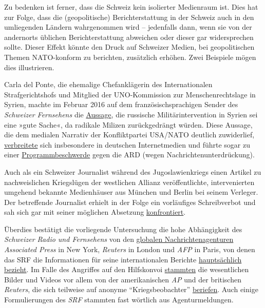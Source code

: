 Zu bedenken ist ferner, dass die Schweiz kein isolierter Medienraum ist.
Dies hat zur Folge, dass die (geopolitische) Berichterstattung in der
Schweiz auch in den umliegenden Ländern wahrgenommen wird -- jedenfalls
dann, wenn sie von der andernorts üblichen Berichterstattung abweichen
oder dieser gar widersprechen sollte. Dieser Effekt könnte den Druck auf
Schweizer Medien, bei geopolitischen Themen NATO-konform zu berichten,
zusätzlich erhöhen. Zwei Beispiele mögen dies illustrieren.

Carla del Ponte, die ehemalige Chef­anklägerin des Internationalen
Strafgerichtshofs und Mitglied der UNO-Kommission zur Menschenrechtslage
in Syrien, machte im Februar 2016 auf dem französischsprachigen Sender
des \emph{Schweizer Fernsehens} die
\href{http://www.rts.ch/info/monde/7480285-carla-del-ponte-l-intervention-de-la-russie-en-syrie-etait-une-bonne-chose-.html}{Aussage},
die russische Militärintervention in Syrien sei eine »gute Sache«, da
radikale Milizen zurückgedrängt würden. Diese Aussage, die dem medialen
Narrativ der Konfliktpartei USA/NATO deutlich zuwiderlief,
\href{http://deutsche-wirtschafts-nachrichten.de/2016/02/10/merkel-und-nato-im-abseits-un-kommissarin-lobt-russlands-einsatz-in-syrien/}{verbreitete}
sich insbesondere in deutschen Internetmedien und führte sogar zu einer
\href{http://www.rationalgalerie.de/schmock/tagesschau-carla-del-ponte-gilt-nicht.html}{Programmbeschwerde}
gegen die ARD (wegen Nachrichten­unter­drückung).

Auch als ein Schweizer Journalist während des Jugo­slawien­kriegs einen
Artikel zu nach­weislichen Kriegslügen der westlichen Allianz
veröffentlichte, intervenierten umgehend bekannte Medienhäuser aus
München und Berlin bei seinem Verleger. Der betreffende Journalist
erhielt in der Folge ein vorläufiges Schreibverbot und sah sich gar mit
seiner möglichen Absetzung
\href{https://swprs.org/das-gewuenschte-narrativ/}{konfrontiert}.

Überdies bestätigt die vorliegende Untersuchung die hohe Abhängigkeit
des \emph{Schweizer Radio und Fernsehens} von den
\href{https://swprs.org/der-propaganda-multiplikator/}{globalen
Nachrichtenagenturen} \emph{Associated Press} in New York,
\emph{Reuters} in London und \emph{AFP} in Paris, von denen das SRF die
Informationen für seine internationalen Berichte
\href{https://swprs.org/die-schleusenwaerter/}{hauptsächlich bezieht}.
Im Falle des Angriffes auf den Hilfskonvoi
\href{https://www.youtube.com/watch?v=RdN_siggEn0}{stammten} die
wesentlichen Bilder und Videos vor allem von der amerikanischen
\emph{AP} und der britischen \emph{Reuters}, die sich teilweise auf
anonyme ``Kriegsbeobachter''
\href{http://www.reuters.com/article/us-mideast-crisis-syria-idUSKCN11P146}{beriefen}.
Auch einige Formulierungen des \emph{SRF} stammten fast wörtlich aus
Agenturmeldungen.

